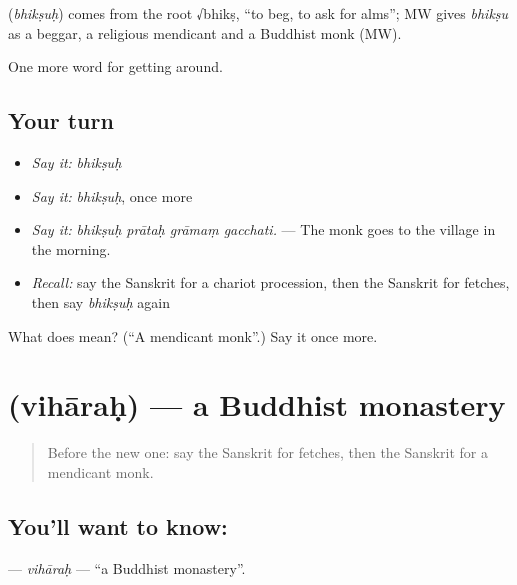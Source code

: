 \begin{cousinweb}
\textbf{} (\emph{bhikṣuḥ}) comes from the root √bhikṣ, \textquotedblleft{}to beg, to ask for alms\textquotedblright{}; MW gives \emph{bhikṣu} as a beggar, a religious mendicant and a Buddhist monk (MW).
\end{cousinweb}

\begin{grammarlens}[title={What you've built}]
One more word for getting around.
\end{grammarlens}

\subsection*{Your turn}
\begin{itemize}
\raggedright
  \item \emph{Say it:} \emph{bhikṣuḥ}
  \item \emph{Say it:} \emph{bhikṣuḥ}, once more
  \item \emph{Say it:} \emph{bhikṣuḥ prātaḥ grāmaṃ gacchati.} — The monk goes to the village in the morning.
  \item \emph{Recall:} say the Sanskrit for a chariot procession, then the Sanskrit for fetches, then say \emph{bhikṣuḥ} again
\end{itemize}

\begin{tcolorbox}[breakable,colback=teal!4,colframe=teal!35!black,title={Before you move on}]
What does  mean? (\textquotedblleft{}A mendicant monk\textquotedblright{}.) Say it once more.
\end{tcolorbox}
\section[\texorpdfstring{\sk{विहारः} (vihāraḥ)}{विहारः (vihāraḥ)}]{ (vihāraḥ) — a Buddhist monastery}

\label{lesson:SA-C401-viharah}



\begin{quote}
Before the new one: say the Sanskrit for fetches, then the Sanskrit for a mendicant monk.
\end{quote}

\subsection*{You'll want to know: }
\textbf{} — \emph{vihāraḥ} — \textquotedblleft{}a Buddhist monastery\textquotedblright{}.

